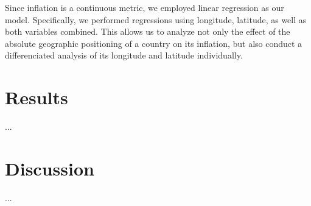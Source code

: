 \documentclass{article}
\begin{document}
    Since inflation is a continuous metric, we employed linear regression as our model. Specifically, we performed regressions using longitude, latitude, as well as both variables combined. This allows us to analyze not only the effect of the absolute geographic positioning of a country on its inflation, but also conduct a differenciated analysis of its longitude and latitude individually.

    \section{Results}
    
    ...

    \section{Discussion}
    
    ...

    \newpage
    \printbibliography
\end{document}
